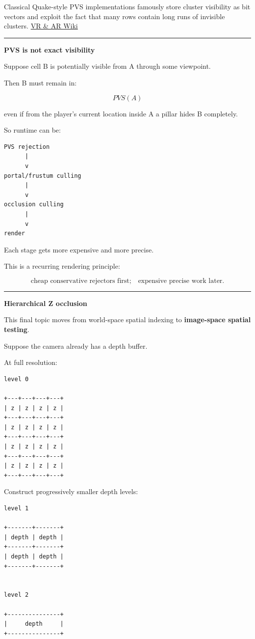 Classical Quake-style PVS implementations famously store cluster visibility as bit vectors and exploit the fact that many rows contain long runs of invisible clusters. \href{https://vrarwiki.com/wiki/Potentially_visible_set?utm_source=chatgpt.com}{VR \& AR Wiki}

\begin{center}\rule{0.5\linewidth}{0.5pt}\end{center}

\textbf{PVS is not exact visibility}

Suppose cell B is potentially visible from A through some viewpoint.

Then B must remain in:

\[
PVS(A)
\]

even if from the player's current location inside A a pillar hides B completely.

So runtime can be:

\begin{verbatim}
PVS rejection
      |
      v
portal/frustum culling
      |
      v
occlusion culling
      |
      v
render
\end{verbatim}

Each stage gets more expensive and more precise.

This is a recurring rendering principle:

\[
\boxed{
\text{cheap conservative rejectors first;}
\quad
\text{expensive precise work later}.
}
\]

\begin{center}\rule{0.5\linewidth}{0.5pt}\end{center}

\textbf{Hierarchical Z occlusion}

This final topic moves from world-space spatial indexing to \textbf{image-space spatial testing}.

Suppose the camera already has a depth buffer.

At full resolution:

\begin{verbatim}
level 0

+---+---+---+---+
| z | z | z | z |
+---+---+---+---+
| z | z | z | z |
+---+---+---+---+
| z | z | z | z |
+---+---+---+---+
| z | z | z | z |
+---+---+---+---+
\end{verbatim}

Construct progressively smaller depth levels:

\begin{verbatim}
level 1

+-------+-------+
| depth | depth |
+-------+-------+
| depth | depth |
+-------+-------+


level 2

+---------------+
|     depth     |
+---------------+
\end{verbatim}

